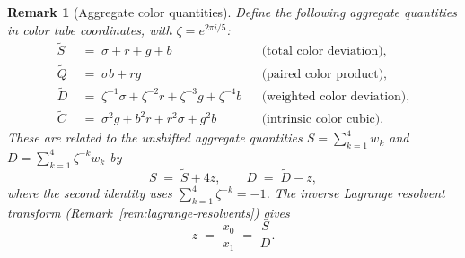 \documentclass[12pt,a4paper]{report}
\newtheorem{remark}[theorem]{Remark}
\begin{document}
\begin{remark}[Aggregate color quantities]
\label{rem:aggregate-color-quantities}
  Define the following aggregate quantities in color tube coordinates,
  with $\zeta = e^{2\pi i/5}$:
  \begin{align}
    \widetilde{S} &\;=\; \sigma + r + g + b
      &&\text{(total color deviation),}
      \label{eq:agg-S-tilde}\\[4pt]
    \widetilde{Q} &\;=\; \sigma b + r g
      &&\text{(paired color product),}
      \label{eq:agg-Q-tilde}\\[4pt]
    \widetilde{D} &\;=\; \zeta^{-1}\sigma + \zeta^{-2}r + \zeta^{-3}g + \zeta^{-4}b
      &&\text{(weighted color deviation),}
      \label{eq:agg-D-tilde}\\[4pt]
    \widetilde{C} &\;=\; \sigma^2 g + b^2 r + r^2\sigma + g^2 b
      &&\text{(intrinsic color cubic).}
      \label{eq:agg-C-tilde}
  \end{align}
  These are related to the unshifted aggregate quantities
  $S = \sum_{k=1}^{4}w_k$ and $D = \sum_{k=1}^{4}\zeta^{-k}w_k$ by
  \begin{equation}\label{eq:aggregate-shift}
    S \;=\; \widetilde{S} + 4z, \qquad D \;=\; \widetilde{D} - z,
  \end{equation}
  where the second identity uses $\sum_{k=1}^{4}\zeta^{-k} = -1$.
  The inverse Lagrange resolvent transform
  (Remark~\ref{rem:lagrange-resolvents}) gives
  \begin{equation}\label{eq:z-from-SD}
    z \;=\; \frac{x_0}{x_1} \;=\; \frac{S}{D}.
  \end{equation}
\end{remark}
\end{document}
